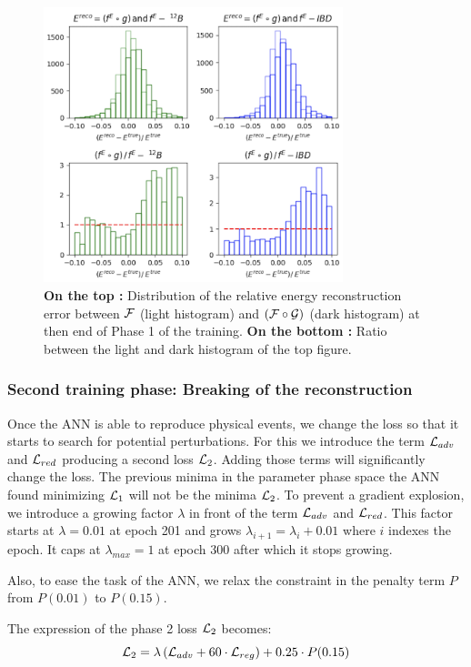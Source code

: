 \documentclass[../main.tex]{subfiles}
\begin{document}
\begin{figure}[!ht]
  \centering
  \includegraphics[height=8cm]{images/janne/rec_err_200.png}
  \caption{\textbf{On the top :} Distribution of the relative energy reconstruction error between ${\cal F}$ (light histogram) and $({\cal F} \circ {\cal G})$ (dark histogram) at then end of Phase 1 of the training. \textbf{On the bottom :} Ratio between the light and dark histogram of the top figure.}
  \label{fig:janne:rec_err_200}
\end{figure}


\subsubsection{Second training phase: Breaking of the reconstruction}
\label{sec:janne:results:break}

Once the ANN is able to reproduce physical events, we change the loss so that it starts to search for potential perturbations.
For this we introduce the term ${\cal L}_{adv}$ and ${\cal L}_{red}$ producing a second loss ${\cal L}_2$.
Adding those terms will significantly change the loss.
The previous minima in the parameter phase space the ANN found minimizing ${\cal L}_1$ will not be the minima ${\cal L}_2$. To prevent a gradient explosion, we introduce a growing factor $\lambda$ in front of the term ${\cal L}_{adv}$ and ${\cal L}_{red}$. This factor starts at $\lambda  = 0.01$ at epoch 201 and grows $\lambda_{i+1} = \lambda_{i} + 0.01$ where $i$ indexes the epoch. It caps at $\lambda_{max} = 1$ at epoch 300 after which it stops growing.

Also, to ease the task of the ANN, we relax the constraint in the penalty term $P$ from $P(0.01)$ to $P(0.15)$.

The expression of the phase 2 loss ${\cal L}_2$ becomes:
\begin{equation}
  \label{eq:janne:phase_2:loss}
  {\cal L}_2 = \lambda \left( {\cal L}_{adv} + 60 \cdot {\cal L}_{reg} \right) + 0.25 \cdot P(0.15)
\end{equation}
\end{document}
